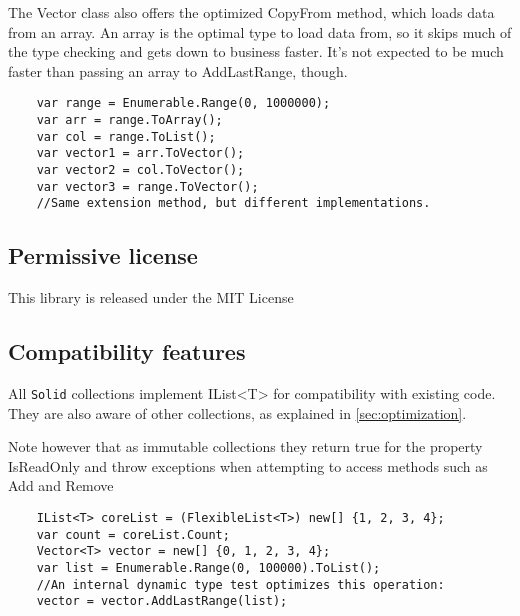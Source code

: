 \documentclass[]{article}
\newcommand{\codeformat}{\ttfamily}
\newcommand{\methodformat}{\codeformat\color{MidnightBlue}}
\newcommand{\keywordformat}{\codeformat\color{blue}}
\newcommand{\keyword}[1]{{\keywordformat #1}}
\newcommand{\method}[1]{{\methodformat #1}}
\newcommand{\solid}{\texttt{Solid}\xspace}
\begin{document}
The Vector class also offers the optimized \method{CopyFrom} method, which loads data from an array. An array is the optimal type to load data from, so it skips much of the type checking and gets down to business faster. It's not expected to be much faster than passing an array to AddLastRange, though.

\begin{lstlisting}
	var range = Enumerable.Range(0, 1000000);
	var arr = range.ToArray();
	var col = range.ToList();
	var vector1 = arr.ToVector();
	var vector2 = col.ToVector();
	var vector3 = range.ToVector();
	//Same extension method, but different implementations.
\end{lstlisting}

\subsection{Permissive license}
This library is released under the MIT License 

\subsection{Compatibility features}\label{sec:compatibility}
All \solid collections implement IList<T> for compatibility with existing code. They are also aware of other collections, as explained in \cref{sec:optimization}.

Note however that as immutable collections they return \keyword{true} for the property IsReadOnly and throw exceptions when attempting to access methods such as \method{Add} and Remove

\begin{lstlisting}
	IList<T> coreList = (FlexibleList<T>) new[] {1, 2, 3, 4};
	var count = coreList.Count;
	Vector<T> vector = new[] {0, 1, 2, 3, 4};
	var list = Enumerable.Range(0, 100000).ToList();
	//An internal dynamic type test optimizes this operation:
	vector = vector.AddLastRange(list);
\end{lstlisting}
\end{document}
